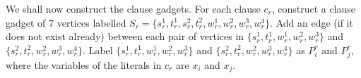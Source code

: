 
We shall now construct the clause gadgets. For each clause $c_r$, construct a clause gadget of $7$ vertices labelled $S_r = \{ s_r^1, t_r^1, s_r^2, t_r^2, w_r^1, w_r^2, w_r^3, w_r^4 \}$. Add an edge (if it does not exist already) between each pair of vertices in $\{ s_r^1, t_r^1, w_r^1, w_r^2, w_r^3 \}$ and $\{ s_r^2, t_r^2, w_r^2, w_r^3, w_r^4 \}$. Label $\{ s_r^1, t_r^1, w_r^1, w_r^2, w_r^3 \}$ and $\{ s_r^2, t_r^2, w_r^2, w_r^3, w_r^4 \}$ as $P_i^r$ and $P_j^r$, where the variables of the literals in $c_r$ are $x_i$ and $x_j$.


